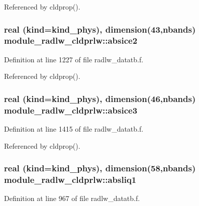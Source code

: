 Referenced by cldprop().

\subsubsection[{\texorpdfstring{absice2}{absice2}}]{\setlength{\rightskip}{0pt plus 5cm}real (kind=kind\+\_\+phys), dimension(43,nbands) module\+\_\+radlw\+\_\+cldprlw\+::absice2}\hypertarget{group__module__radlw__main_gad2238686c0e6d1c5d74bcfdde1542e1d}{}\label{group__module__radlw__main_gad2238686c0e6d1c5d74bcfdde1542e1d}


Definition at line 1227 of file radlw\+\_\+datatb.\+f.



Referenced by cldprop().

\subsubsection[{\texorpdfstring{absice3}{absice3}}]{\setlength{\rightskip}{0pt plus 5cm}real (kind=kind\+\_\+phys), dimension(46,nbands) module\+\_\+radlw\+\_\+cldprlw\+::absice3}\hypertarget{group__module__radlw__main_ga3aa04541d0b809367f88ef8aa0eafdbb}{}\label{group__module__radlw__main_ga3aa04541d0b809367f88ef8aa0eafdbb}


Definition at line 1415 of file radlw\+\_\+datatb.\+f.



Referenced by cldprop().

\subsubsection[{\texorpdfstring{absliq1}{absliq1}}]{\setlength{\rightskip}{0pt plus 5cm}real (kind=kind\+\_\+phys), dimension(58,nbands) module\+\_\+radlw\+\_\+cldprlw\+::absliq1}\hypertarget{group__module__radlw__main_ga57896538226e9184c3750440d9f62166}{}\label{group__module__radlw__main_ga57896538226e9184c3750440d9f62166}


Definition at line 967 of file radlw\+\_\+datatb.\+f.



